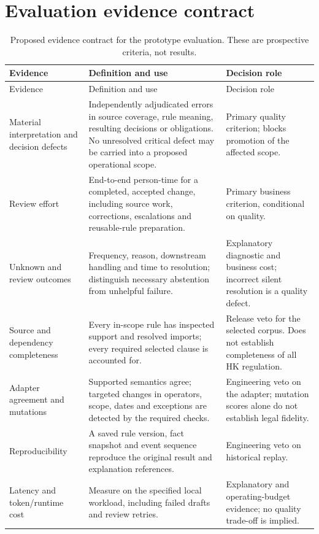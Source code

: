 \documentclass[12pt,a4paper,oneside,openany]{book}
\begin{document}
\section{Evaluation evidence contract}
\begingroup\small
\begin{longtable}{P{0.25\textwidth}P{0.39\textwidth}P{0.26\textwidth}}
\caption{Proposed evidence contract for the prototype evaluation. These are
prospective criteria, not results.}\label{tab:evaluation-detail}\\
\toprule Evidence & Definition and use & Decision role \\\midrule
\endfirsthead
\toprule Evidence & Definition and use & Decision role \\\midrule
\endhead
Material interpretation and decision defects & Independently adjudicated errors
in source coverage, rule meaning, resulting decisions or obligations. No unresolved
critical defect may be carried into a proposed operational scope. & Primary quality
criterion; blocks promotion of the affected scope.\\
Review effort & End-to-end person-time for a completed, accepted change, including
source work, corrections, escalations and reusable-rule preparation. & Primary
business criterion, conditional on quality.\\
Unknown and review outcomes & Frequency, reason, downstream handling and time to
resolution; distinguish necessary abstention from unhelpful failure. & Explanatory
diagnostic and business cost; incorrect silent resolution is a quality defect.\\
Source and dependency completeness & Every in-scope rule has inspected support and
resolved imports; every required selected clause is accounted for. & Release veto
for the selected corpus. Does not establish completeness of all HK regulation.\\
Adapter agreement and mutations & Supported semantics agree; targeted changes in
operators, scope, dates and exceptions are detected by the required checks. &
Engineering veto on the adapter; mutation scores alone do not establish legal fidelity.\\
Reproducibility & A saved rule version, fact snapshot and event sequence reproduce
the original result and explanation references. & Engineering veto on historical replay.\\
Latency and token/runtime cost & Measure on the specified local workload, including
failed drafts and review retries. & Explanatory and operating-budget evidence; no
quality trade-off is implied.\\
\bottomrule
\end{longtable}
\endgroup
\end{document}
